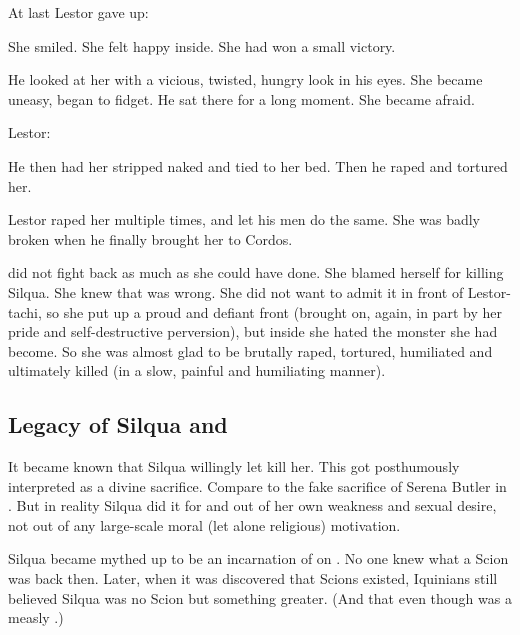 At last Lestor gave up: 

She smiled. 
She felt happy inside. 
She had won a small victory. 

He looked at her with a vicious, twisted, hungry look in his eyes. 
She became uneasy, began to fidget. 
He sat there for a long moment. 
She became afraid. 

Lestor: 

He then had her stripped naked and tied to her bed. 
Then he raped and tortured her. 



Lestor raped her multiple times, and let his men do the same. 
She was badly broken when he finally brought her to Cordos. 

\Delphine{} did not fight back as much as she could have done. 
She blamed herself for killing Silqua. 
She knew that was wrong. 
She did not want to admit it in front of Lestor-tachi, so she put up a proud and defiant front (brought on, again, in part by her pride and self-destructive perversion), but inside she hated the monster she had become. 
So she was almost glad to be brutally raped, tortured, humiliated and ultimately killed (in a slow, painful and humiliating manner). 










\subsection{Legacy of Silqua and \Delphine}
It became known that Silqua willingly let \Delphine{} kill her. 
This got posthumously interpreted as a divine sacrifice. 
Compare to the fake sacrifice of Serena Butler in \cite{BrianHerbert:LegendsofDune}. 
But in reality Silqua did it for \Delphine{} and out of her own weakness and sexual desire, not out of any large-scale moral (let alone religious) motivation. 

Silqua became mythed up to be an incarnation of \iquin{} on \Miith{}. 
No one knew what a Scion was back then.
Later, when it was discovered that Scions existed, Iquinians still believed Silqua was no Scion but something greater. 
(And that even though \Aryal{} was a measly \thelyad.) 

